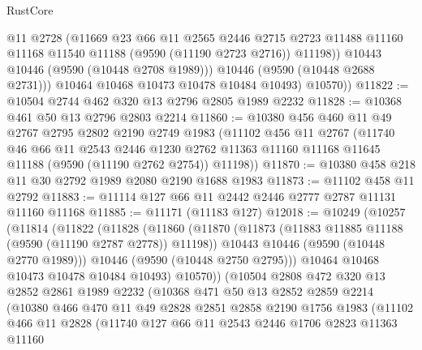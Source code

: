 \begin{lexlean}{RustCore}
\begin{coremodule}
                @11
                @2728
                (@11669
                  @23
                  @66
                  @11
                  @2565
                  @2446
                  @2715
                  @2723
                  @11488
                  @11160
                  @11168
                  @11540
                  @11188
                  (@9590 (@11190 @2723 @2716))
                  @11198))
              @10443
              @10446
              (@9590 (@10448 @2708 @1989)))
            @10446
            (@9590 (@10448 @2688 @2731)))
          @10464
          @10468
          @10473
          @10478
          @10484
          @10493)
        @10570))
@11822 := @10504 @2744 @462 @320 @13 @2796 @2805 @1989 @2232
@11828 := @10368 @461 @50 @13 @2796 @2803 @2214
@11860 := @10380
    @456
    @460
    @11
    @49
    @2767
    @2795
    @2802
    @2190
    @2749
    @1983
    (@11102
      @456
      @11
      @2767
      (@11740
        @46
        @66
        @11
        @2543
        @2446
        @1230
        @2762
        @11363
        @11160
        @11168
        @11645
        @11188
        (@9590 (@11190 @2762 @2754))
        @11198))
@11870 := @10380 @458 @218 @11 @30 @2792 @1989 @2080 @2190 @1688 @1983
@11873 := @11102 @458 @11 @2792
@11883 := @11114 @127 @66 @11 @2442 @2446 @2777 @2787 @11131 @11160 @11168
@11885 := @11171 (@11183 @127)
@12018 := @10249
    (@10257
      (@11814
        (@11822
          (@11828
            (@11860
              (@11870
                (@11873 (@11883 @11885 @11188 (@9590 (@11190 @2787 @2778)) @11198))
                @10443
                @10446
                (@9590 (@10448 @2770 @1989)))
              @10446
              (@9590 (@10448 @2750 @2795)))
            @10464
            @10468
            @10473
            @10478
            @10484
            @10493)
          @10570))
      (@10504
        @2808
        @472
        @320
        @13
        @2852
        @2861
        @1989
        @2232
        (@10368
          @471
          @50
          @13
          @2852
          @2859
          @2214
          (@10380
            @466
            @470
            @11
            @49
            @2828
            @2851
            @2858
            @2190
            @1756
            @1983
            (@11102
              @466
              @11
              @2828
              (@11740
                @127
                @66
                @11
                @2543
                @2446
                @1706
                @2823
                @11363
                @11160

\end{coremodule}
\end{lexlean}
